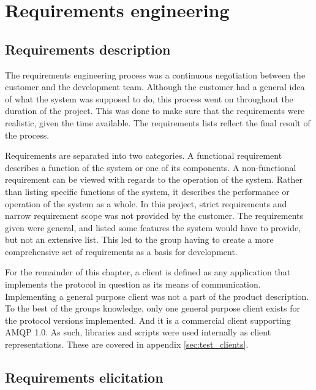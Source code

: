 
\chapter{Requirements engineering}
\label{ch:requirements_engineering}

\section{Requirements description}

The requirements engineering process was a continuous negotiation between the customer and the development team. Although the customer had a general idea of what the system was supposed to do, this process went on throughout the duration of the project. This was done to make sure that the requirements were realistic, given the time available. The requirements lists reflect the final result of the process.

Requirements are separated into two categories. A functional requirement describes a function of the system or one of its components. A non-functional requirement can be viewed with regards to the operation of the system. Rather than listing specific functions of the system, it describes the performance or operation of the system as a whole. In this project, strict requirements and narrow requirement scope was not provided by the customer. The requirements given were general, and listed some features the system would have to provide, but not an extensive list. This led to the group having to create a more comprehensive set of requirements as a basis for development.

For the remainder of this chapter, a client is defined as any application that implements the protocol in question as its means of communication. Implementing a general purpose client was not a part of the product description. To the best of the groups knowledge, only one general purpose client exists for the protocol versions implemented. And it is a commercial client supporting AMQP 1.0. As such, libraries and scripts were used internally as client representations. These are covered in appendix \ref{sec:test_clients}.

\section{Requirements elicitation}
\label{sec:requirements_engineering-requirements_elicitation}

